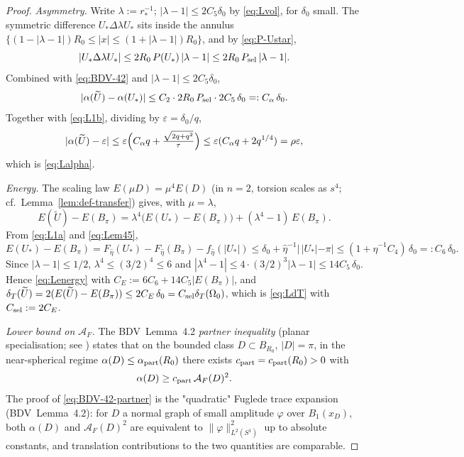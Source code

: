 \documentclass[11pt]{amsart}
\newcommand{\dT}{\delta_T}
\newcommand{\AF}{\mathcal A_F}
\newcommand{\wt}{\widetilde}
\begin{document}
\begin{proof}
\emph{Asymmetry.}  Write \(\lambda:=r_*^{-1}\); \(|\lambda-1|\le 2C_5
\delta_0\) by \eqref{eq:Lvol}, for \(\delta_0\) small.  The symmetric
difference \(U_*\Delta\lambda U_*\) sits inside the annulus
\(\{(1-|\lambda-1|)R_0\le|x|\le(1+|\lambda-1|)R_0\}\), and by
\eqref{eq:P-Ustar},
\begin{equation}\label{eq:dilL1}
   |U_*\Delta\lambda U_*|\le 2R_0\,P(U_*)\,|\lambda-1|
      \le 2R_0\,P_{\rm sel}\,|\lambda-1|.
\end{equation}
Combined with \eqref{eq:BDV-42} and \(|\lambda-1|\le 2C_5\delta_0\),
\[
   |\alpha(\wt U)-\alpha(U_*)|\le C_2\cdot 2R_0\,P_{\rm sel}\cdot
   2C_5\,\delta_0
      =: C_\alpha\,\delta_0.
\]
Together with \eqref{eq:L1b}, dividing by \(\varepsilon=\delta_0/q\),
\[
   |\alpha(\wt U)-\varepsilon|\le\varepsilon
   \Bigl(C_\alpha q+\tfrac{\sqrt{2q+q^2}}{\tau}\Bigr)
   \le \varepsilon(C_\alpha q+2q^{1/4})=\rho\varepsilon,
\]
which is \eqref{eq:Lalpha}.

\emph{Energy.}  The scaling law \(E(\mu D)=\mu^{4}E(D)\) (in \(n=2\),
torsion scales as \(s^{4}\); cf.\ Lemma~\ref{lem:def-transfer}) gives,
with \(\mu=\lambda\),
\[
   E(\wt U)-E(B_\pi)=\lambda^{4}\bigl(E(U_*)-E(B_\pi)\bigr)
      +(\lambda^{4}-1)\,E(B_\pi).
\]
From \eqref{eq:L1a} and \eqref{eq:Lem45},
\[
   E(U_*)-E(B_\pi)
   =F_{\hat\eta}(U_*)-F_{\hat\eta}(B_\pi)-f_{\hat\eta}(|U_*|)
   \le\delta_0+\hat\eta^{-1}|\,|U_*|-\pi|
   \le(1+\hat\eta^{-1}C_4)\,\delta_0
   =:C_6\,\delta_0.
\]
Since \(|\lambda-1|\le 1/2\), \(\lambda^{4}\le(3/2)^{4}\le 6\) and
\(|\lambda^{4}-1|\le 4\cdot(3/2)^{3}|\lambda-1|\le 14C_5\,\delta_0\).
Hence \eqref{eq:Lenergy} with \(C_E:=6C_6+14C_5|E(B_\pi)|\), and
\(\dT(\wt U)=2(E(\wt U)-E(B_\pi))\le 2C_E\,\delta_0=C_{\rm sel}\dT(\Omega_0)\),
which is \eqref{eq:LdT} with \(C_{\rm sel}:=2C_E\).

\emph{Lower bound on \(\AF\).}  The BDV~Lemma~4.2 \emph{partner
inequality} (planar specialisation; see \cite[Lemma~4.2,
(4.7)--(4.8)]{BDV2015}) states that on the bounded class
\(D\subset B_{R_0}\), \(|D|=\pi\), in the near-spherical regime
\(\alpha(D)\le\alpha_{\rm part}(R_0)\) there exists
\(c_{\rm part}=c_{\rm part}(R_0)>0\) with
\begin{equation}\label{eq:BDV-42-partner}
   \alpha(D)\ge c_{\rm part}\,\AF(D)^2.
\end{equation}
The proof of \eqref{eq:BDV-42-partner} is the "quadratic" Fuglede
trace expansion (BDV~Lemma~4.2): for \(D\) a normal graph of small
amplitude \(\varphi\) over \(B_1(x_D)\), both \(\alpha(D)\) and
\(\AF(D)^2\) are equivalent to \(\|\varphi\|_{L^2(S^1)}^2\) up to
absolute constants, and translation contributions to the two
quantities are comparable.


\end{proof}
\end{document}
